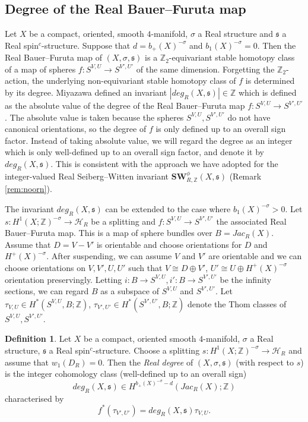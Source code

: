 \documentclass{amsart}
\theoremstyle{definition}
\newtheorem{definition}[theorem]{Definition}
\theoremstyle{remark}
\numberwithin{equation}{section}
\begin{document}
\subsection{Degree of the Real Bauer--Furuta map}\label{sec:deg}

Let $X$ be a compact, oriented, smooth $4$-manifold, $\sigma$ a Real structure and $\mathfrak{s}$ a Real spin$^c$-structure. Suppose that $d = b_+(X)^{-\sigma}$ and $b_1(X)^{-\sigma} = 0$. Then the Real Bauer--Furuta map of $(X,\sigma , \mathfrak{s})$ is a $\mathbb{Z}_2$-equivariant stable homotopy class of a map of spheres $f : S^{V,U} \to S^{V',U'}$ of the same dimension. Forgetting the $\mathbb{Z}_2$-action, the underlying non-equivariant stable homotopy class of $f$ is determined by its degree. Miyazawa \cite{mi} defined an invariant $|deg_R(X,\mathfrak{s})| \in \mathbb{Z}$ which is defined as the absolute value of the degree of the Real Bauer--Furuta map $f : S^{V,U} \to S^{V',U'}$. The absolute value is taken because the spheres $S^{V,U}, S^{V',U'}$ do not have canonical orientations, so the degree of $f$ is only defined up to an overall sign factor. Instead of taking absolute value, we will regard the degree as an integer which is only well-defined up to an overall sign factor, and denote it by $deg_R(X , \mathfrak{s})$. This is consistent with the approach we have adopted for the integer-valued Real Seiberg--Witten invariant $\mathbf{SW}^\phi_{R,\mathbb{Z}}(X,\mathfrak{s})$ (Remark \ref{rem:noorn}).

The invariant $deg_R(X,\mathfrak{s})$ can be extended to the case where $b_1(X)^{-\sigma} > 0$. Let $s : H^1(X ; \mathbb{Z})^{-\sigma} \to \mathcal{H}_R$ be a splitting and $f : S^{V,U} \to S^{V',U'}$ the associated Real Bauer--Furuta map. This is a map of sphere bundles over $B = Jac_R(X)$. Assume that $D = V - V'$ is orientable and choose orientations for $D$ and $H^+(X)^{-\sigma}$. After suspending, we can assume $V$ and $V'$ are orientable and we can choose orientations on $V,V',U,U'$ such that $V \cong D \oplus V'$, $U' \cong U \oplus H^+(X)^{-\sigma}$ orientation preservingly. Letting $i : B \to S^{V,U}, i' : B \to S^{V',U'}$ be the infinity sections, we can regard $B$ as a subspace of $S^{V,U}$ and $S^{V',U'}$. Let $\tau_{V,U} \in H^*( S^{V,U} , B ; \mathbb{Z} )$, $\tau_{V',U'} \in H^*( S^{V',U'} , B ; \mathbb{Z})$ denote the Thom classes of $S^{V,U}, S^{V',U'}$. 

\begin{definition}\label{def:degree}
Let $X$ be a compact, oriented smooth $4$-manifold, $\sigma$ a Real structure, $\mathfrak{s}$ a Real spin$^c$-structure. Choose a splitting $s : H^1(X ; \mathbb{Z})^{-\sigma} \to \mathcal{H}_R$ and assume that $w_1(D_R) = 0$. Then the {\em Real degree} of $(X , \sigma , \mathfrak{s})$ (with respect to $s$) is the integer cohomology class (well-defined up to an overall sign)
\[
deg_R(X , \mathfrak{s}) \in H^{b_+(X)^{-\sigma} - d}( Jac_R(X) ; \mathbb{Z})
\]
characterised by
\[
f^*( \tau_{V',U'} ) = deg_R(X , \mathfrak{s}) \tau_{V,U}.
\]
\end{definition}
\end{document}
